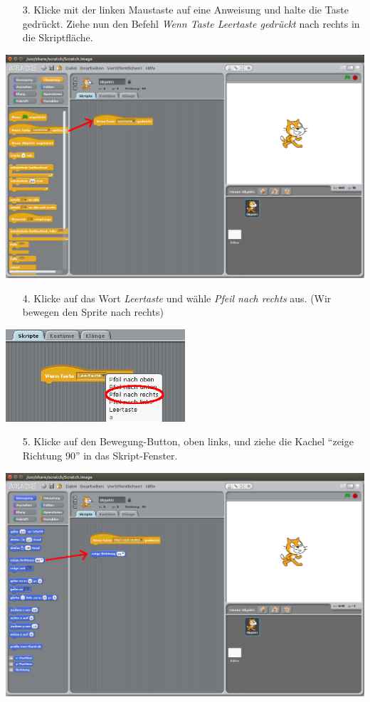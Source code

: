 \begin{itemize}
\item[3.] Klicke mit der linken Maustaste auf eine Anweisung und halte die Taste gedrückt. Ziehe nun den Befehl
 \textit{Wenn Taste Leertaste gedrückt} nach rechts in die Skriptfläche. 
\end{itemize}
\includegraphics[width=\textwidth]{images/aufgabe1_steuerung_verschieben.png}

\begin{itemize}
\item[4.] Klicke auf das Wort \textit{Leertaste} und wähle \textit{Pfeil nach rechts} aus.  (Wir bewegen den Sprite nach rechts)
\end{itemize}
\includegraphics[width=0.5\textwidth]{images/aufgabe1_dropdown.png}

\begin{itemize}
\item[5.] Klicke auf den Bewegung-Button, oben links, und ziehe die Kachel “zeige Richtung 90” in das Skript-Fenster.
\end{itemize}
\includegraphics[width=\textwidth]{images/aufgabe1_bewegung_verschieben.png}

